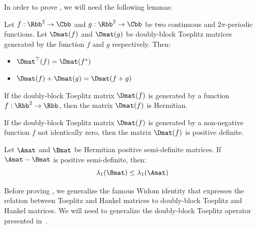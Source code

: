 \noindent
In order to prove , we will need the following lemmas:

\begin{lemma} \label{theorem:properties_block_toeplitz}
  Let $f:\Rbb^2 \rightarrow \Cbb$ and $g:\Rbb^2 \rightarrow \Cbb$ be two continuous and $2\pi$-periodic functions. Let $\Dmat(f)$ and $\Dmat(g)$ be doubly-block Toeplitz matrices generated by the function $f$ and $g$ respectively. Then:
  \begin{itemize}
      \item $\Dmat^\top(f) = \Dmat(f^*)$
      \item $\Dmat(f) + \Dmat(g) = \Dmat(f + g)$
  \end{itemize}
  \removespace
\end{lemma}

\begin{lemma} \label{theorem:block_toeplitz_hermitian}
  If the doubly-block Toeplitz matrix $\Dmat(f)$ is generated by a function $f: \Rbb^2 \rightarrow \Rbb$, then the matrix $\Dmat(f)$ is Hermitian. 
\end{lemma}

\begin{lemma} \label{theorem:block_toeplitz_positive_definite}
  If the doubly-block Toeplitz matrix $\Dmat(f)$ is generated by a non-negative function $f$ not identically zero, then the matrix $\Dmat(f)$ is positive definite. 
\end{lemma}

\begin{lemma} \label{theorem:diff_positive_semidefinite_matrices}
Let $\Amat$ and $\Bmat$ be Hermitian positive semi-definite matrices. If $\Amat - \Bmat$ is positive semi-definite, then:
  \begin{equation}
      \lambda_1 \left( \Bmat \right) \leq \lambda_1 \left( \Amat \right)
  \end{equation}
  \removespace
\end{lemma}


Before proving , we generalize the famous Widom identity \cite{widom1976asymptotic} that expresses the relation between Toeplitz and Hankel matrices to doubly-block Toeplitz and Hankel matrices.
We will need to generalize the doubly-block Toeplitz operator presented in~.

